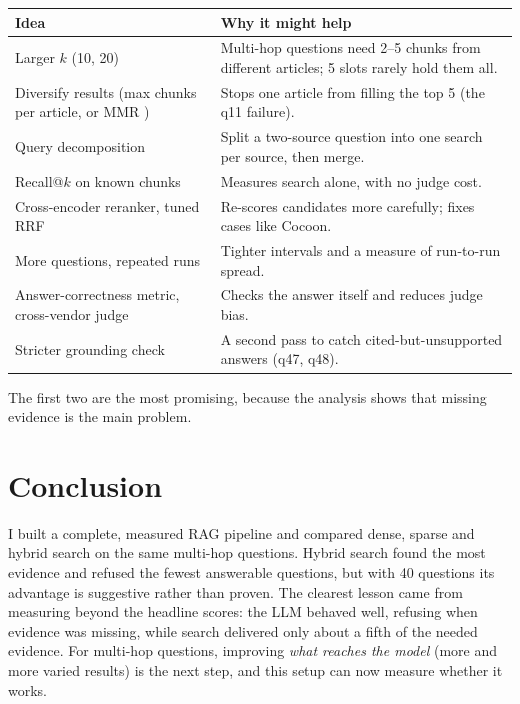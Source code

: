 \documentclass[10pt,twocolumn]{article}
\begin{document}
\begin{center}
\small
\begin{tabularx}{\columnwidth}{@{}>{\raggedright\arraybackslash}p{}>{\raggedright\arraybackslash}X@{}}
\toprule
Idea & Why it might help \\
\midrule
Larger $k$ (10, 20) & Multi-hop questions need 2--5 chunks from different articles; 5 slots rarely hold them all. \\
Diversify results (max chunks per article, or MMR \cite{mmr}) & Stops one article from filling the top 5 (the q11 failure). \\
Query decomposition & Split a two-source question into one search per source, then merge. \\
Recall@$k$ on known chunks & Measures search alone, with no judge cost. \\
Cross-encoder reranker, tuned RRF & Re-scores candidates more carefully; fixes cases like Cocoon. \\
More questions, repeated runs & Tighter intervals and a measure of run-to-run spread. \\
Answer-correctness metric, cross-vendor judge & Checks the answer itself and reduces judge bias. \\
Stricter grounding check & A second pass to catch cited-but-unsupported answers (q47, q48). \\
\bottomrule
\end{tabularx}
\end{center}

The first two are the most promising, because the analysis shows that missing evidence is the main problem.

\section{Conclusion}
I built a complete, measured RAG pipeline and compared dense, sparse and hybrid search on the same multi-hop questions. Hybrid search found the most evidence and refused the fewest answerable questions, but with 40 questions its advantage is suggestive rather than proven. The clearest lesson came from measuring beyond the headline scores: the LLM behaved well, refusing when evidence was missing, while search delivered only about a fifth of the needed evidence. For multi-hop questions, improving \emph{what reaches the model} (more and more varied results) is the next step, and this setup can now measure whether it works.
\end{document}

